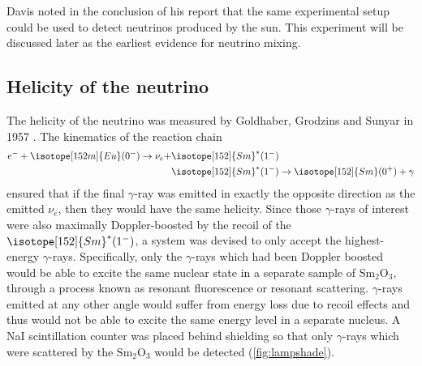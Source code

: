 Davis noted in the conclusion of his report that the same experimental setup
could be used to detect neutrinos produced by the sun.
This experiment will be discussed later as the earliest evidence
for neutrino mixing.

\subsection{Helicity of the neutrino}
\label{subsec:helicity}

The helicity of the neutrino was measured by
Goldhaber, Grodzins and Sunyar in 1957 \cite{helicity_measurement,helicity_review}.
The kinematics of the reaction chain
\begin{align}\label{eq:lampshade}
    \begin{split}
        e^- + \isotope[152m]{Eu}(0^-) \to \nu_e
        + & \isotope[152]{Sm}^*(1^-) \\
          & \isotope[152]{Sm}^*(1^-) \to \isotope[152]{Sm}(0^+) + \gamma
    \end{split}
\end{align}
ensured that if the final $\gamma$-ray was emitted
in exactly the opposite direction as the emitted $\nu_e$,
then they would have the same helicity.
Since those $\gamma$-rays of interest
were also maximally Doppler-boosted by the recoil of the $\isotope[152]{Sm}^*(1^-)$,
a system was devised to only accept the highest-energy $\gamma$-rays.
Specifically, only the $\gamma$-rays which had been Doppler boosted
would be able to excite the same nuclear state in a separate sample of
$\text{Sm}_2\text{O}_3$,
through a process known as resonant fluorescence or resonant scattering.
$\gamma$-rays emitted at any other angle would suffer from energy loss
due to recoil effects
and thus would not be able to excite the same energy level in a separate nucleus.
A NaI scintillation counter was placed behind shielding
so that only $\gamma$-rays which were scattered by the $\text{Sm}_2\text{O}_3$
would be detected (\cref{fig:lampshade}).

